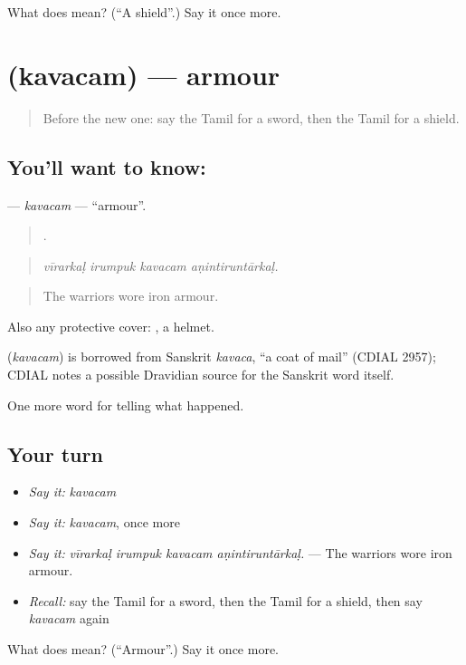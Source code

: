 \begin{tcolorbox}[breakable,colback=teal!4,colframe=teal!35!black,title={Before you move on}]
What does  mean? (\textquotedblleft{}A shield\textquotedblright{}.) Say it once more.
\end{tcolorbox}
\section[\texorpdfstring{\ta{கவசம்} (kavacam)}{கவசம் (kavacam)}]{ (kavacam) — armour}

\label{lesson:TA-C333-kavacam}



\begin{quote}
Before the new one: say the Tamil for a sword, then the Tamil for a shield.
\end{quote}

\subsection*{You'll want to know: }
\textbf{} — \emph{kavacam} — \textquotedblleft{}armour\textquotedblright{}.

\begin{quote}
   .
\end{quote}

\begin{quote}
\emph{vīrarkaḷ irumpuk kavacam aṇintiruntārkaḷ.}
\end{quote}

\begin{quote}
The warriors wore iron armour.
\end{quote}

Also any protective cover: , a helmet.

\begin{cousinweb}
\textbf{} (\emph{kavacam}) is borrowed from Sanskrit \emph{kavaca}, \textquotedblleft{}a coat of mail\textquotedblright{} (CDIAL 2957); CDIAL notes a possible Dravidian source for the Sanskrit word itself.
\end{cousinweb}

\begin{grammarlens}[title={What you've built}]
One more word for telling what happened.
\end{grammarlens}

\subsection*{Your turn}
\begin{itemize}
\raggedright
  \item \emph{Say it:} \emph{kavacam}
  \item \emph{Say it:} \emph{kavacam}, once more
  \item \emph{Say it:} \emph{vīrarkaḷ irumpuk kavacam aṇintiruntārkaḷ.} — The warriors wore iron armour.
  \item \emph{Recall:} say the Tamil for a sword, then the Tamil for a shield, then say \emph{kavacam} again
\end{itemize}

\begin{tcolorbox}[breakable,colback=teal!4,colframe=teal!35!black,title={Before you move on}]
What does  mean? (\textquotedblleft{}Armour\textquotedblright{}.) Say it once more.
\end{tcolorbox}
